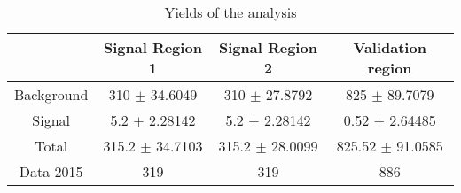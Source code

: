\documentclass[10pt]{article}
\begin{document}
\begin{table}[htbp]
\begin{center}
\begin{tabular}{|c|c|c|c|}
\hline 
 & Signal Region 1 & Signal Region 2 & Validation region\\
\hline 
  Background   & \num[round-mode=figures,round-precision=3]{310} $\pm$ \num[round-mode=figures,round-precision=3]{34.6049} & \num[round-mode=figures,round-precision=3]{310} $\pm$ \num[round-mode=figures,round-precision=3]{27.8792} & \num[round-mode=figures,round-precision=3]{825} $\pm$ \num[round-mode=figures,round-precision=3]{89.7079} \\ 
  Signal   & \num[round-mode=figures,round-precision=3]{5.2} $\pm$ \num[round-mode=figures,round-precision=3]{2.28142} & \num[round-mode=figures,round-precision=3]{5.2} $\pm$ \num[round-mode=figures,round-precision=3]{2.28142} & \num[round-mode=figures,round-precision=3]{0.52} $\pm$ \num[round-mode=figures,round-precision=3]{2.64485} \\ 
\hline 
  Total  & \num[round-mode=figures,round-precision=3]{315.2} $\pm$ \num[round-mode=figures,round-precision=3]{34.7103} & \num[round-mode=figures,round-precision=3]{315.2} $\pm$ \num[round-mode=figures,round-precision=3]{28.0099} & \num[round-mode=figures,round-precision=3]{825.52} $\pm$ \num[round-mode=figures,round-precision=3]{91.0585} \\ 
\hline 
  Data 2015   & 319 & 319 & 886 \\ 
\hline 
\end{tabular} 
\caption{Yields of the analysis} 
\end{center} 
\end{table} 
\end{document}
